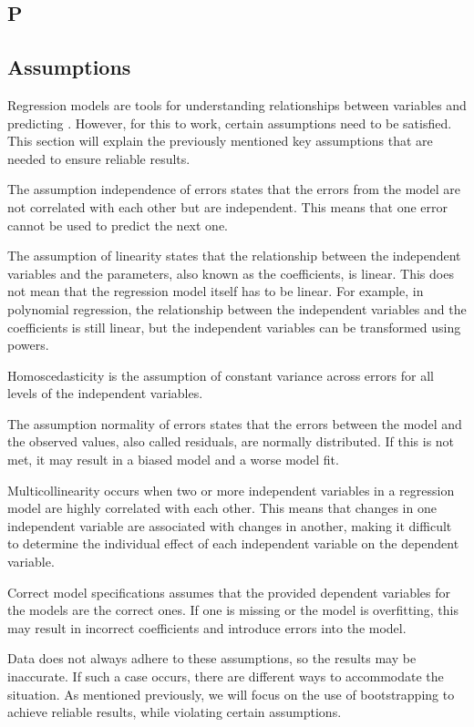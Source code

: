 \subsection{P}



\subsection{Assumptions}

Regression models are tools for understanding relationships between variables and predicting . However, for this to work, certain assumptions need to be satisfied. This section will explain the previously mentioned key assumptions that are needed to ensure reliable results. \newline

\noindent The assumption independence of errors states that the errors from the model are not correlated with each other but are independent. This means that one error cannot be used to predict the next one. \newline


\noindent The assumption of linearity states that the relationship between the independent variables and the parameters, also known as the coefficients, is linear. This does not mean that the regression model itself has to be linear. For example, in polynomial regression, the relationship between the independent variables and the coefficients is still linear, but the independent variables can be transformed using powers.\newline


\noindent Homoscedasticity is the assumption of constant variance across errors for all levels of the independent variables. \newline

\noindent The assumption normality of errors states that the errors between the model and the observed values, also called residuals, are normally distributed. If this is not met, it may result in a biased model and a worse model fit. \newline


\noindent Multicollinearity occurs when two or more independent variables in a regression model are highly correlated with each other. This means that changes in one independent variable are associated with changes in another, making it difficult to determine the individual effect of each independent variable on the dependent variable. \newline

\noindent Correct model specifications assumes that the provided dependent variables for the models are the correct ones. If one is missing or the model is overfitting, this may result in incorrect coefficients and introduce errors into the model. \newline

\noindent Data does not always adhere to these assumptions, so the results may be inaccurate. 
If such a case occurs, there are different ways to accommodate the situation. As mentioned previously, we will focus on the use of bootstrapping to achieve reliable results, while violating certain assumptions. 


